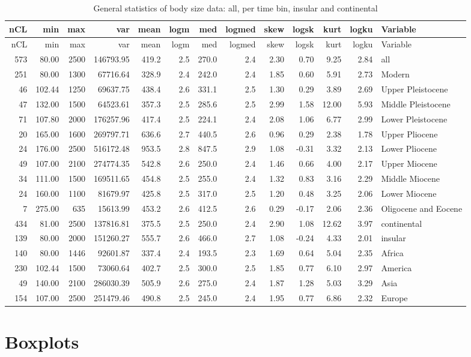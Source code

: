 \documentclass[]{article}
\begin{document}
\begin{longtable}[]{@{}rrrrrrrrrrrrl@{}}
\caption{General statistics of body size data: all, per time bin,
insular and continental}\tabularnewline
\toprule
nCL & min & max & var & mean & logm & med & logmed & skew & logsk & kurt
& logku & Variable\tabularnewline
\midrule
\endfirsthead
\toprule
nCL & min & max & var & mean & logm & med & logmed & skew & logsk & kurt
& logku & Variable\tabularnewline
\midrule
\endhead
573 & 80.00 & 2500 & 146793.95 & 419.2 & 2.5 & 270.0 & 2.4 & 2.30 & 0.70
& 9.25 & 2.84 & all\tabularnewline
251 & 80.00 & 1300 & 67716.64 & 328.9 & 2.4 & 242.0 & 2.4 & 1.85 & 0.60
& 5.91 & 2.73 & Modern\tabularnewline
46 & 102.44 & 1250 & 69637.75 & 438.4 & 2.6 & 331.1 & 2.5 & 1.30 & 0.29
& 3.89 & 2.69 & Upper Pleistocene\tabularnewline
47 & 132.00 & 1500 & 64523.61 & 357.3 & 2.5 & 285.6 & 2.5 & 2.99 & 1.58
& 12.00 & 5.93 & Middle Pleistocene\tabularnewline
71 & 107.80 & 2000 & 176257.96 & 417.4 & 2.5 & 224.1 & 2.4 & 2.08 & 1.06
& 6.77 & 2.99 & Lower Pleistocene\tabularnewline
20 & 165.00 & 1600 & 269797.71 & 636.6 & 2.7 & 440.5 & 2.6 & 0.96 & 0.29
& 2.38 & 1.78 & Upper Pliocene\tabularnewline
24 & 176.00 & 2500 & 516172.48 & 953.5 & 2.8 & 847.5 & 2.9 & 1.08 &
-0.31 & 3.32 & 2.13 & Lower Pliocene\tabularnewline
49 & 107.00 & 2100 & 274774.35 & 542.8 & 2.6 & 250.0 & 2.4 & 1.46 & 0.66
& 4.00 & 2.17 & Upper Miocene\tabularnewline
34 & 111.00 & 1500 & 169511.65 & 454.8 & 2.5 & 255.0 & 2.4 & 1.32 & 0.83
& 3.16 & 2.29 & Middle Miocene\tabularnewline
24 & 160.00 & 1100 & 81679.97 & 425.8 & 2.5 & 317.0 & 2.5 & 1.20 & 0.48
& 3.25 & 2.06 & Lower Miocene\tabularnewline
7 & 275.00 & 635 & 15613.99 & 453.2 & 2.6 & 412.5 & 2.6 & 0.29 & -0.17 &
2.06 & 2.36 & Oligocene and Eocene\tabularnewline
434 & 81.00 & 2500 & 137816.81 & 375.5 & 2.5 & 250.0 & 2.4 & 2.90 & 1.08
& 12.62 & 3.97 & continental\tabularnewline
139 & 80.00 & 2000 & 151260.27 & 555.7 & 2.6 & 466.0 & 2.7 & 1.08 &
-0.24 & 4.33 & 2.01 & insular\tabularnewline
140 & 80.00 & 1446 & 92601.87 & 337.4 & 2.4 & 193.5 & 2.3 & 1.69 & 0.64
& 5.04 & 2.35 & Africa\tabularnewline
230 & 102.44 & 1500 & 73060.64 & 402.7 & 2.5 & 300.0 & 2.5 & 1.85 & 0.77
& 6.10 & 2.97 & America\tabularnewline
49 & 140.00 & 2100 & 286030.39 & 505.9 & 2.6 & 275.0 & 2.4 & 1.87 & 1.28
& 5.03 & 3.29 & Asia\tabularnewline
154 & 107.00 & 2500 & 251479.46 & 490.8 & 2.5 & 245.0 & 2.4 & 1.95 &
0.77 & 6.86 & 2.32 & Europe\tabularnewline
\bottomrule
\end{longtable}

\section{Boxplots}\label{boxplots}
\end{document}
